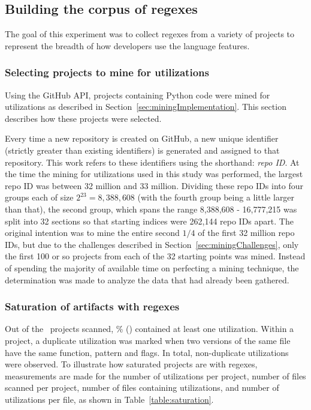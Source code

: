 \subsection{Building the corpus of regexes}
\label{sec:corpusBuilding}

The goal of this experiment was to collect regexes from a variety of projects to represent the breadth of how developers use the language features.

\subsubsection{Selecting projects to mine for utilizations}
Using the GitHub API,  projects containing Python code were mined for utilizations as described in Section~\ref{sec:miningImplementation}.  This section describes how these projects were selected.

Every time a new repository is created on GitHub, a new unique identifier (strictly greater than existing identifiers) is generated and assigned to that repository.  This work refers to these identifiers using the shorthand: \emph{repo ID}.  At the time the mining for utilizations used in this study was performed, the largest repo ID was between 32 million and 33 million.  Dividing these repo IDs into four groups each of size $2^23 = 8,388,608$ (with the fourth group being a little larger than that), the second group, which spans the range 8,388,608 - 16,777,215 was split into 32 sections so that starting indices were 262,144 repo IDs apart.  The original intention was to mine the entire second $1/4$ of the first 32 million repo IDs, but due to the challenges described in Section~\ref{sec:miningChallenges}, only the first 100 or so projects from each of the 32 starting points was mined.  Instead of spending the majority of available time on perfecting a mining technique, the determination was made to analyze the data that had already been gathered.



\subsubsection{Saturation of artifacts with regexes}
Out of the \ projects scanned, \% () contained at least one utilization.  Within a project, a duplicate utilization was marked when two versions of the same file have the same function, pattern and flags.  In total,  non-duplicate utilizations were observed.  To illustrate how saturated projects are with regexes, measurements are made for the number of utilizations per project, number of files scanned per project, number of files containing utilizations, and number of utilizations  per file, as shown in Table~\ref{table:saturation}.

